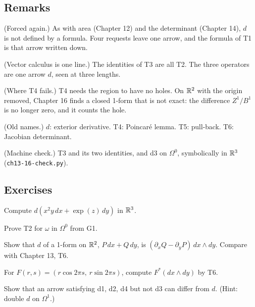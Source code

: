 \subsection*{Remarks}

\begin{lines}
\item[\lab{R1}] (Forced again.) As with area (Chapter 12) and the determinant (Chapter 14), $d$ is not defined by a formula. Four requests leave one arrow, and the formula of T1 is that arrow written down.
\item[\lab{R2}] (Vector calculus is one line.) The identities of T3 are all T2. The three operators are one arrow $d$, seen at three lengths.
\item[\lab{R3}] (Where T4 fails.) T4 needs the region to have no holes. On $\mathbb{R}^2$ with the origin removed, Chapter 16 finds a closed 1-form that is not exact: the difference $Z^1 / B^1$ is no longer zero, and it counts the hole.
\item[\lab{R4}] (Old names.) $d$: exterior derivative. T4: Poincaré lemma. T5: pull-back. T6: Jacobian determinant.
\item[\lab{R5}] (Machine check.) T3 and its two identities, and d3 on $\Omega^0$, symbolically in $\mathbb{R}^3$ (\texttt{ch13-16-check.py}).
\end{lines}

\subsection*{Exercises}

\begin{lines}
\item[\lab{E1}] Compute $d(x^2 y\, dx + \exp(z)\, dy)$ in $\mathbb{R}^3$.
\item[\lab{E2}] Prove T2 for $\omega$ in $\Omega^0$ from G1.
\item[\lab{E3}] Show that $d$ of a 1-form on $\mathbb{R}^2$, $P\,dx + Q\,dy$, is $(\partial_x Q - \partial_y P)\, dx \wedge dy$. Compare with Chapter 13, T6.
\item[\lab{E4}] For $F(r, s) = (r \cos 2\pi s,\ r \sin 2\pi s)$, compute $F^*(dx \wedge dy)$ by T6.
\item[\lab{E5}] Show that an arrow satisfying d1, d2, d4 but not d3 can differ from $d$. (Hint: double $d$ on $\Omega^1$.)
\end{lines}

\newpage

